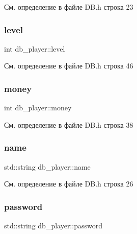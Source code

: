 См. определение в файле D\+B.\+h строка 23

\mbox{\label{structdb__player_a87ec3fa495482d1018974f2694430156}} 
\subsubsection{\texorpdfstring{level}{level}}
{\footnotesize\ttfamily int db\+\_\+player\+::level}



См. определение в файле D\+B.\+h строка 46

\mbox{\label{structdb__player_a11f7c74a3d7b7f6c91f5ac6823c848af}} 
\subsubsection{\texorpdfstring{money}{money}}
{\footnotesize\ttfamily int db\+\_\+player\+::money}



См. определение в файле D\+B.\+h строка 38

\mbox{\label{structdb__player_a182fb42d16b91d5dccc9c640bc649521}} 
\subsubsection{\texorpdfstring{name}{name}}
{\footnotesize\ttfamily std\+::string db\+\_\+player\+::name}



См. определение в файле D\+B.\+h строка 26

\mbox{\label{structdb__player_a44fb2105fb4d116447eee76a5494821d}} 
\subsubsection{\texorpdfstring{password}{password}}
{\footnotesize\ttfamily std\+::string db\+\_\+player\+::password}



